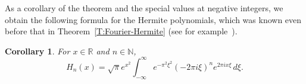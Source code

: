 \documentclass[11pt,a4paper]{amsart}
\newcommand{\N}{\mathbb{N}}
\newcommand{\R}{\mathbb{R}}
\theoremstyle{plain}
\theoremstyle{plain}
\newtheorem{corollary}[theorem]{Corollary}
\theoremstyle{plain}
\theoremstyle{remark}
\begin{document}
As a corollary of the theorem and the special values at negative integers, we obtain the following formula for the Hermite polynomials, which was known even before that in Theorem~\ref{T:Fourier-Hermite} (see for example~\cite[formula 18.10.10]{OP-NIST}).

\begin{corollary}
\label{C:Fourier-Hermite}
For $x \in \R$ and $n \in \N$,
\begin{equation*}
  H_n(x) = \sqrt{\pi} e^{x^2}\int_{-\infty}^\infty e^{-\pi^2\xi^2} (-2\pi i\xi)^{n}e^{2\pi ix\xi}\,d\xi.
\end{equation*}
\end{corollary}


\end{document}
